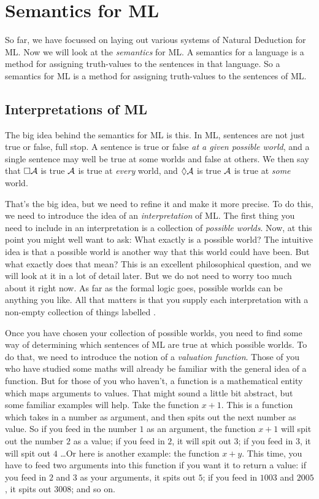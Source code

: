 \chapter{Semantics for ML}
\label{Semantics}

So far, we have focussed on laying out various systems of Natural Deduction for ML. Now we will look at the \emph{semantics} for ML. A semantics for a language is a method for assigning truth-values to the sentences in that language. So a semantics for ML is a method for assigning truth-values to the sentences of ML.

\section{Interpretations of ML}

The big idea behind the semantics for ML is this. In ML, sentences are not just true or false, full stop. A sentence is true or false \emph{at a given possible world}, and a single sentence may well be true at some worlds and false at others. We then say that $\Box \mathcal{A}$ is true \ifeff{} $\mathcal{A}$ is true at \emph{every} world, and $\Diamond\mathcal{A}$ is true \ifeff{} $\mathcal{A}$ is true at \emph{some} world.

That's the big idea, but we need to refine it and make it more precise. To do this, we need to introduce the idea of an \emph{interpretation} of ML. The first thing you need to include in an interpretation is a collection of \emph{possible worlds}. Now, at this point you might well want to ask: What exactly is a possible world? The intuitive idea is that a possible world is another way that this world could have been. But what exactly does that mean? This is an excellent philosophical question, and we will look at it in a lot of detail later. But we do not need to worry too much about it right now. As far as the formal logic goes, possible worlds can be anything you like. All that matters is that you supply each interpretation with a non-empty collection of things labelled .

Once you have chosen your collection of possible worlds, you need to find some way of determining which sentences of ML are true at which possible worlds. To do that, we need to introduce the notion of a \emph{valuation function}. Those of you who have studied some maths will already be familiar with the general idea of a function. But for those of you who haven't, a function is a mathematical entity which maps arguments to values. That might sound a little bit abstract, but some familiar examples will help. Take the function $x+1$. This is a function which takes in a number as argument, and then spits out the next number as value. So if you feed in the number $1$ as an argument, the function $x+1$ will spit out the number $2$ as a value; if you feed in $2$, it will spit out $3$; if you feed in $3$, it will spit out $4$ \dots  Or here is another example: the function $x+y$. This time, you have to feed two arguments into this function if you want it to return a value: if you feed in $2$ and $3$ as your arguments, it spits out $5$; if you feed in $1003$ and $2005$, it spits out $3008$; and so on.


